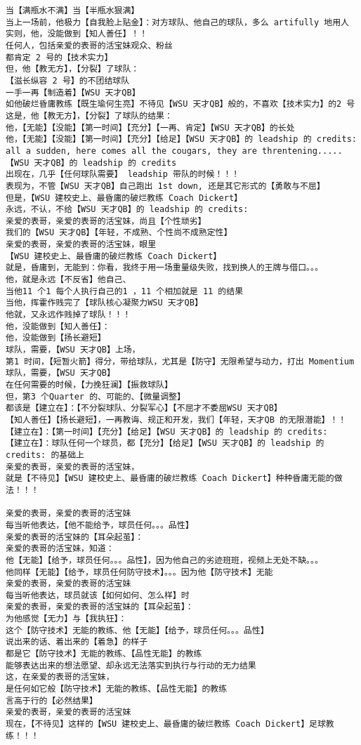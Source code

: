 \documentclass[9pt, b5paper]{article}
\begin{document}
\begin{verbatim}
当【满瓶水不满】当【半瓶水狠满】
当上一场前，他极力【自我脸上贴金】：对方球队、他自己的球队，多么 artifully 地用人
实则，他，没能做到【知人善任】！！
任何人，包括亲爱的表哥的活宝妹观众、粉丝
都肯定 2 号的【技术实力】
但，他【教无方】，【分裂】了球队：
【滋长纵容 2 号】的不团结球队
一手一再【制造着】【WSU 天才QB】
如他破烂昏庸教练【既生瑜何生亮】不待见【WSU 天才QB】般的，不喜欢【技术实力】的2 号
这是，他【教无方】，【分裂】了球队的结果：
他，【无能】【没能】【第一时间】【充分】【一再、肯定】【WSU 天才QB】的长处
他，【无能】【没能】【第一时间】【充分】【给足】【WSU 天才QB】的 leadship 的 credits:
all a sudden, here comes all the cougars, they are threntening.....
【WSU 天才QB】的 leadship 的 credits
出现在，几乎【任何球队需要】 leadship 带队的时候！！！
表现为，不管【WSU 天才QB】自己跑出 1st down, 还是其它形式的【勇敢与不屈】
但是，【WSU 建校史上、最昏庸的破烂教练 Coach Dickert】
永远，不认，不给【WSU 天才QB】的 leadship 的 credits:
亲爱的表哥，亲爱的表哥的活宝妹，尚且【个性顽劣】
我们的【WSU 天才QB】【年轻，不成熟、个性尚不成熟定性】
亲爱的表哥，亲爱的表哥的活宝妹，眼里
【WSU 建校史上、最昏庸的破烂教练 Coach Dickert】
就是，昏庸到，无能到：你看，我终于用一场重量级失败，找到换人的王牌与借口。。。
他，就是永远【不反省】他自己、
当他11 个1 每个人执行自己的1 ，11 个相加就是 11 的结果
当他，挥霍作贱完了【球队核心凝聚力WSU 天才QB】
他就，又永远作贱掉了球队！！！
他，没能做到【知人善任】：
他，没能做到【扬长避短】
球队，需要，【WSU 天才QB】上场，
第1 时间，【短暂火箭】得分，带给球队，尤其是【防守】无限希望与动力，打出 Momentium
球队，需要，【WSU 天才QB】
在任何需要的时候，【力挽狂澜】【振救球队】
但，第3 个Quarter 的、可能的、【微量调整】
都该是【建立在】：【不分裂球队、分裂军心】【不屈才不委屈WSU 天才QB】
【知人善任】【扬长避短】，一再教诲、规正和开发，我们【年轻，天才QB 的无限潜能】！！
【建立在】：【第一时间】【充分】【给足】【WSU 天才QB】的 leadship 的 credits:
【建立在】：球队任何一个球员，都【充分】【给足】【WSU 天才QB】的 leadship 的 credits: 的基础上
亲爱的表哥，亲爱的表哥的活宝妹，
就是【不待见】【WSU 建校史上、最昏庸的破烂教练 Coach Dickert】种种昏庸无能的做法！！！

亲爱的表哥，亲爱的表哥的活宝妹
每当听他表达，【他不能给予，球员任何。。。品性】
亲爱的表哥的活宝妹的【耳朵起茧】：
亲爱的表哥的活宝妹，知道：
他【无能】【给予，球员任何。。。品性】，因为他自己的劣迹班班，视频上无处不缺。。。
他同样【无能】【给予，球员任何防守技术】。。。因为他【防守技术】无能
亲爱的表哥，亲爱的表哥的活宝妹
每当听他表达，球员就该【如何如何、怎么样】时
亲爱的表哥，亲爱的表哥的活宝妹的【耳朵起茧】：
为他感觉【无力】与【我执狂】：
这个【防守技术】无能的教练、他【无能】【给予，球员任何。。。品性】
说出来的话、着出来的【着急】的样子
都是它【防守技术】无能的教练、【品性无能】的教练
能够表达出来的想法愿望、却永远无法落实到执行与行动的无力结果
这，在亲爱的表哥的活宝妹，
是任何如它般【防守技术】无能的教练、【品性无能】的教练
言高于行的【必然结果】
亲爱的表哥，亲爱的表哥的活宝妹
现在，【不待见】这样的【WSU 建校史上、最昏庸的破烂教练 Coach Dickert】足球教练！！！


\end{verbatim}
\end{document}
